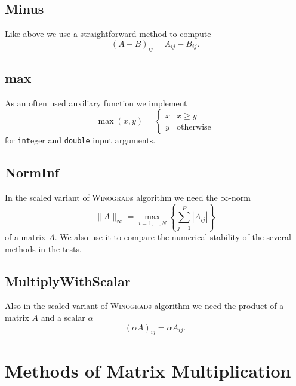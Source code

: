 \documentclass{amsart}
\newcommand{\CODE}[2]{}
\begin{document}
\subsection{Minus} Like above we use a straightforward method to compute
\[
(A-B)_{ij}= A_{ij} - B_{ij}.
\]
\CODE{Minus.c}{3}

\subsection{max} As an often used auxiliary function we implement
\[
\max(x,y) = \begin{cases}
x & x \geq y\\
y & \text{otherwise}
\end{cases}
\]
for \texttt{int}eger and \texttt{double} input arguments.
\CODE{max.c}{3}

\subsection{NormInf} In the scaled variant of \textsc{Winograd}s algorithm we need the $\infty$-norm
\[
\|A\|_\infty = \max_{i=1,\ldots,N}\left\{\sum_{j=1}^P |A_{ij}|\right\}
\]
of a matrix $A$. We also use it to compare the numerical stability of the several methods in the tests.
\CODE{NormInf.c}{3}

\subsection{MultiplyWithScalar} Also in the scaled variant of \textsc{Winograd}s algorithm we need the product of a matrix $A$ and a scalar $\alpha$
\[
(\alpha A)_{ij} = \alpha A_{ij}.
\]
\CODE{MultiplyWithScalar.c}{3} 





































\newpage\section{Methods of Matrix Multiplication}
\end{document}
